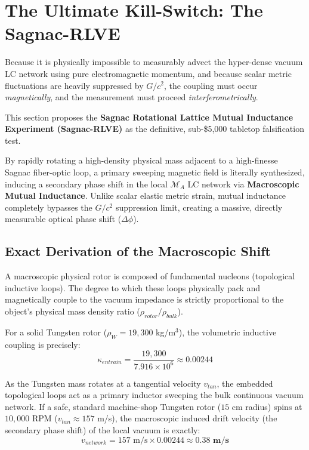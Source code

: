 \section{The Ultimate Kill-Switch: The Sagnac-RLVE}

Because it is physically impossible to measurably advect the hyper-dense vacuum LC network using pure electromagnetic momentum, and because scalar metric fluctuations are heavily suppressed by $G/c^2$, the coupling must occur \textit{magnetically}, and the measurement must proceed \textit{interferometrically}. 

This section proposes the \textbf{Sagnac Rotational Lattice Mutual Inductance Experiment (Sagnac-RLVE)} as the definitive, sub-\$5,000 tabletop falsification test.

By rapidly rotating a high-density physical mass adjacent to a high-finesse Sagnac fiber-optic loop, a primary sweeping magnetic field is literally synthesized, inducing a secondary phase shift in the local $\mathcal{M}_A$ LC network via \textbf{Macroscopic Mutual Inductance}. Unlike scalar elastic metric strain, mutual inductance completely bypasses the $G/c^2$ suppression limit, creating a massive, directly measurable optical phase shift ($\Delta \phi$). 

\subsection{Exact Derivation of the Macroscopic Shift}
A macroscopic physical rotor is composed of fundamental nucleons (topological inductive loops). The degree to which these loops physically pack and magnetically couple to the vacuum impedance is strictly proportional to the object's physical mass density ratio ($\rho_{rotor} / \rho_{bulk}$). 

For a solid Tungsten rotor ($\rho_W = 19,300$ kg/m$^3$), the volumetric inductive coupling is precisely:
\begin{equation}
    \kappa_{entrain} = \frac{19,300}{7.916 \times 10^6} \approx \mathbf{0.00244}
\end{equation}

As the Tungsten mass rotates at a tangential velocity $v_{tan}$, the embedded topological loops act as a primary inductor sweeping the bulk continuous vacuum network. If a safe, standard machine-shop Tungsten rotor ($15$ cm radius) spins at $10,000$ RPM ($v_{tan} \approx 157$ m/s), the macroscopic induced drift velocity (the secondary phase shift) of the local vacuum is exactly:
\begin{equation}
    v_{network} = 157 \text{ m/s} \times 0.00244 \approx \mathbf{0.38 \text{ m/s}}
\end{equation}

